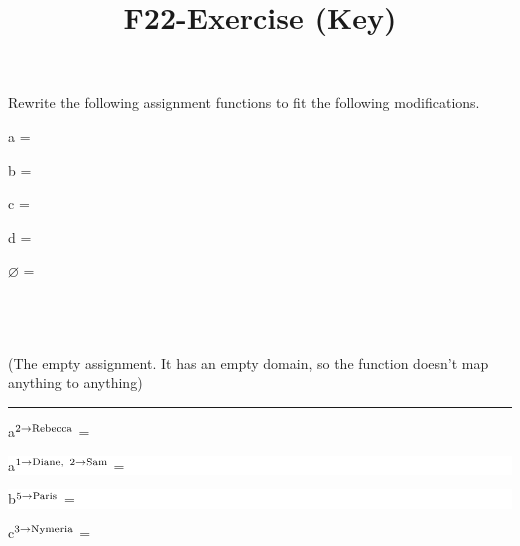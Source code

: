 \documentclass{article}
\title{F22-Exercise \color{KUCrimson!60!black} (Key)}
\begin{document}
\maketitle
\newcommand{\amod}[2]{\ensuremath{^{\scriptsize \textrm{#1} \to \textrm{#2}}}}

Rewrite the following assignment functions to fit the following modifications.

\begin{multicols}{3}
a  = \fleft {}    \fright

b  = \fleft {}    \fright

c  = \fleft {}    \fright

d  = \fleft {}    \fright

$\varnothing$ =  \parbox[t]{1.5in}{~\\ ~ \\ ~ \\  (The empty assignment. It has an empty domain, so the function doesn't map anything to anything)}
\end{multicols}

\hrule

\newcommand{\boxxx}{
\begin{minipage}[t][1.5in][t]{.5\textwidth}
\question }
 
 {\colorbox{gray!05!white}{\boxxx a\amod{2}{Rebecca}  =  
 
 \centering \vspace{12pt} \fleft {}    \fright  
\end{minipage}
}}
%
\colorbox{white}{\boxxx a\amod{1}{Diane, }\amod{2}{Sam} =  

 \centering \vspace{12pt}   \fleft {}    \fright  
\end{minipage}
}

 {\colorbox{white}{\boxxx b\amod{5}{Paris} =   
 
  \centering \vspace{12pt}   \fleft {}     \fright
\end{minipage}}
}%
\colorbox{gray!05!white}{\boxxx  c\amod{3}{Nymeria} = 

  \centering \vspace{12pt}   
\end{minipage}
}
\end{document}
